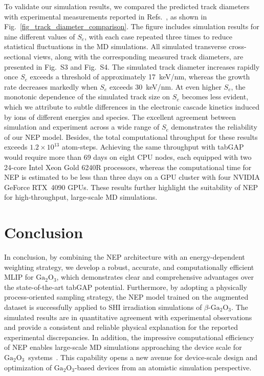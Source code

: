 \documentclass[%
reprint,
superscriptaddress,
 amsmath,amssymb,
 aps,
]{revtex4-2}
\newcommand{\ga}{$\text{Ga}_2\text{O}_3$}
\begin{document}
To validate our simulation results, we compared the predicted track diameters with
experimental measurements reported in Refs.~\cite{xu_thermal_2025,ai_radiation_2019},
as shown in Fig.~\ref{fig_track_diameter_comparison}.
The figure includes simulation results for nine different values of $S_e$, with each
case repeated three times to reduce statistical fluctuations in the MD simulations. 
All simulated transverse cross-sectional views, along with the corresponding measured 
track diameters, are presented in Fig.~S3 and Fig.~S4. 
The simulated track diameter increases rapidly once $S_e$ exceeds a threshold of 
approximately 17~keV/nm, whereas the growth rate decreases markedly when $S_e$ exceeds 30~keV/nm.
At even higher $S_e$, the monotonic dependence of the simulated track size on 
$S_e$ becomes less evident, which we attribute to subtle differences 
in the electronic cascade kinetics induced by ions of different energies and species.
The excellent agreement between simulation and experiment across a wide range of $S_e$ 
demonstrates the reliability of our NEP model.
Besides, the total computational throughput for these results exceeds
$1.2\times10^{13}$ atom-steps.
Achieving the same throughput with tabGAP would require more than 69 days on eight
CPU nodes, each equipped with two 24-core Intel Xeon Gold 6240R processors, whereas
the computational time for NEP is estimated to be less than three days on a GPU 
cluster with four NVIDIA GeForce RTX~4090 GPUs.
These results further highlight the suitability of NEP for high-throughput,
large-scale MD simulations.

\section{Conclusion}

In conclusion, by combining the NEP architecture with an energy-dependent weighting
strategy, we develop a robust, accurate, and computationally efficient MLIP for \ga,
which demonstrates clear and comprehensive advantages over the state-of-the-art tabGAP
potential.
Furthermore, by adopting a physically process-oriented sampling strategy, the NEP model
trained on the augmented dataset is successfully applied to SHI irradiation simulations
of $\beta$-\ga.
The simulated results are in quantitative agreement with experimental observations and
provide a consistent and reliable physical explanation for the reported experimental
discrepancies.
In addition, the impressive computational efficiency of NEP enables large-scale MD
simulations approaching the device scale for \ga\ systems~\cite{xu_device-scale_2025}.
This capability opens a new avenue for device-scale design and optimization of
\ga-based devices from an atomistic simulation perspective.
\end{document}
